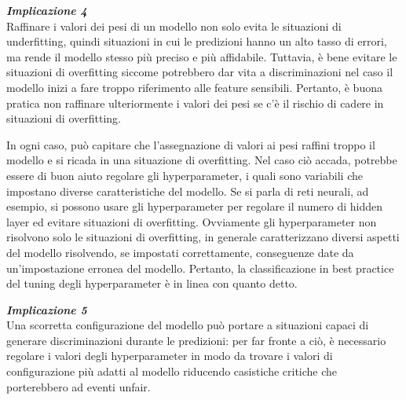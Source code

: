 \begin{center}
    \begin{tcolorbox}[width=400pt, colframe=black, colback=Gray!10]
			\begin{minipage}{\textwidth}
				\textit{\faCaretSquareORight  \textbf{ Implicazione 4}}\\
		     Raffinare i valori dei pesi di un modello non solo evita le situazioni di underfitting, quindi situazioni in cui le predizioni hanno un alto tasso di errori, ma rende il modello stesso più preciso e più affidabile. Tuttavia, è bene evitare le situazioni di overfitting siccome potrebbero dar vita a discriminazioni nel caso il modello inizi a fare troppo riferimento alle feature sensibili. Pertanto, è buona pratica non raffinare ulteriormente i valori dei pesi se c'è il rischio di cadere in situazioni di overfitting.
			\end{minipage}
	\end{tcolorbox}
\end{center}

In ogni caso, può capitare che l'assegnazione di valori ai pesi raffini troppo il modello e si ricada in una situazione di overfitting. Nel caso ciò accada, potrebbe essere di buon aiuto regolare gli hyperparameter, i quali sono variabili che impostano diverse caratteristiche del modello. Se si parla di reti neurali, ad esempio, si possono usare gli hyperparameter per regolare il numero di hidden layer ed evitare situazioni di overfitting. Ovviamente gli hyperparameter non risolvono solo le situazioni di overfitting, in generale caratterizzano diversi aspetti del modello risolvendo, se impostati correttamente, conseguenze date da un'impostazione erronea del modello. Pertanto, la classificazione in best practice del tuning degli hyperparameter è in linea con quanto detto.

\begin{center}
    \begin{tcolorbox}[width=400pt, colframe=black, colback=Gray!10]
			\begin{minipage}{\textwidth}
				\textit{\faCaretSquareORight  \textbf{ Implicazione 5}}\\
		     Una scorretta configurazione del modello può portare a situazioni capaci di generare discriminazioni durante le predizioni: per far fronte a ciò, è necessario regolare i valori degli hyperparameter in modo da trovare i valori di configurazione più adatti al modello riducendo casistiche critiche che porterebbero ad eventi unfair.
			\end{minipage}
	\end{tcolorbox}
\end{center}

